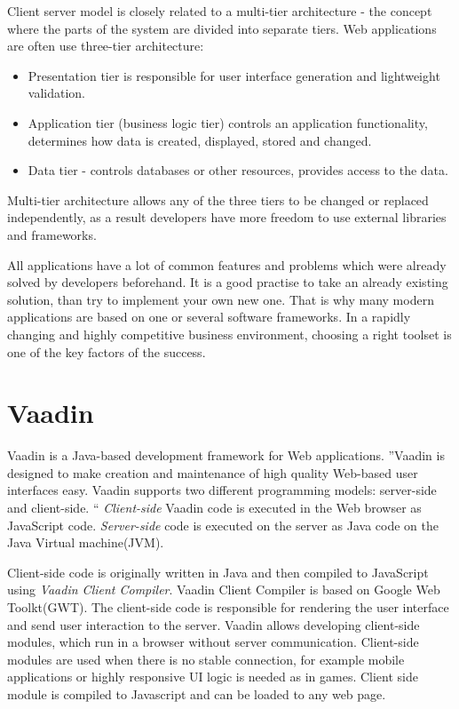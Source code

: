     	Client server model is closely related to a multi-tier architecture - the
    	concept where the parts of the system are divided into separate tiers. Web applications
    	 are often use three-tier architecture:
    	 \begin{itemize}
    	   \item Presentation tier is responsible for user interface generation and
    	   lightweight validation.
    	   \item Application tier (business logic tier) controls an application
    	   functionality, determines how data is created, displayed, stored and
    	   changed.
    	   \item Data tier - controls databases or other resources, provides access
    	   to the data.
    	 \end{itemize}
    	Multi-tier architecture allows any of the three tiers to be changed or
    	replaced independently, as a result developers have more freedom to use
    	external libraries and frameworks.
		
		All	applications have a lot of common features and problems which were already
		solved by developers beforehand. It is a good practise to take an already
		existing solution, than try to implement your own new one. That is why many
		modern applications are based on one or several software frameworks. In a
		rapidly changing and highly competitive business environment, choosing a right toolset is one of
		the key factors of the success.	 	
		
  \section{Vaadin}
  \label{ch:vaadin}
    Vaadin is a Java-based development framework for Web applications. ''Vaadin
    is designed to make creation and maintenance of high quality Web-based user interfaces easy.
   Vaadin supports two different programming models: server-side and client-side. 
   `` \cite[pr1.1]{bookVaaidn}
   \emph{Client-side} Vaadin code is executed in the Web browser as JavaScript
   code.
   \emph{Server-side} code is executed on the server as Java code on the Java
   Virtual machine(JVM).

   Client-side code is originally written in Java and then
   compiled to JavaScript using \emph{Vaadin Client Compiler}. Vaadin Client Compiler is based on Google
   Web Toolkt(GWT). The client-side code is responsible for rendering
   the user interface and send user interaction to the server. Vaadin allows
   developing client-side modules, which run in a browser without server
   communication. Client-side modules are used when there is no stable
   connection, for example mobile applications or  highly responsive UI logic is
   needed as in games. Client side module is compiled to Javascript and can be
   loaded to any web page.
   
